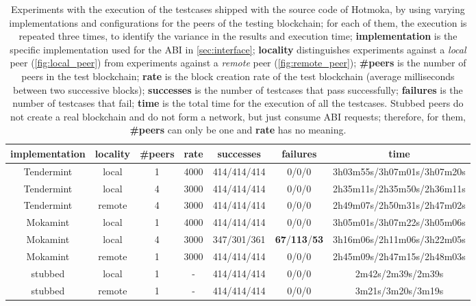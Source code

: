 \begin{table}
  \begin{center}
  \begin{tabular}{|c|c|c|c||c|c|c|}
    \hline
    \textbf{implementation} & \textbf{locality} & \textbf{\#peers} & \textbf{rate} & \textbf{successes} & \textbf{failures} & \textbf{time}\\\hline\hline
    Tendermint & local & 1 & 4000 & 414/414/414 & 0/0/0 & 3h03m55s/3h07m01s/3h07m20s\\\hline %
    Tendermint & local & 4 & 3000 & 414/414/414 & 0/0/0 & 2h35m11s/2h35m50s/2h36m11s\\\hline %
    Tendermint & remote & 4 & 3000 & 414/414/414 & 0/0/0 & 2h49m07s/2h50m31s/2h47m02s\\\hline %
    Mokamint & local & 1 & 4000 & 414/414/414 & 0/0/0 & 3h05m01s/3h07m22s/3h05m06s\\\hline %
    Mokamint & local & 4 & 3000 & 347/301/361 & \textbf{67}/\textbf{113}/\textbf{53} & 3h16m06s/2h11m06s/3h22m05s\\\hline %
    Mokamint & remote & 1 & 3000 & 414/414/414 & 0/0/0 & 2h45m09s/2h47m15s/2h48m03s\\\hline %
    stubbed & local & 1 & - & 414/414/414 & 0/0/0 & 2m42s/2m39s/2m39s\\\hline %
    stubbed & remote & 1 & - & 414/414/414 & 0/0/0 & 3m21s/3m20s/3m19s\\\hline %
  \end{tabular}
  \caption{Experiments with the execution of the testcases shipped with the
    source code of Hotmoka, by using varying implementations and configurations for the
    peers of the testing blockchain; for each of them, the execution is repeated three times,
    to identify the variance in the results and execution time;
    \textbf{implementation} is the specific implementation
    used for the ABI in \cref{sec:interface};
    \textbf{locality} distinguishes experiments against a \emph{local} peer
    (\cref{fig:local_peer}) from experiments against a \emph{remote} peer
    (\cref{fig:remote_peer});
    \textbf{\#peers} is the number of peers in the test blockchain;
    \textbf{rate} is the block creation rate of the test blockchain
    (average milliseconds between two successive blocks);
    \textbf{successes} is the number of testcases that pass successfully;
    \textbf{failures} is the number of testcases that fail; \textbf{time}
    is the total time for the execution of all the testcases.
    Stubbed peers do not create a real blockchain and do not form a network,
    but just consume ABI requests; therefore, for them,
    \textbf{\#peers} can only be one and \textbf{rate} has no meaning.
  }
  \label{tab:experiments}
  \end{center}
\end{table}


